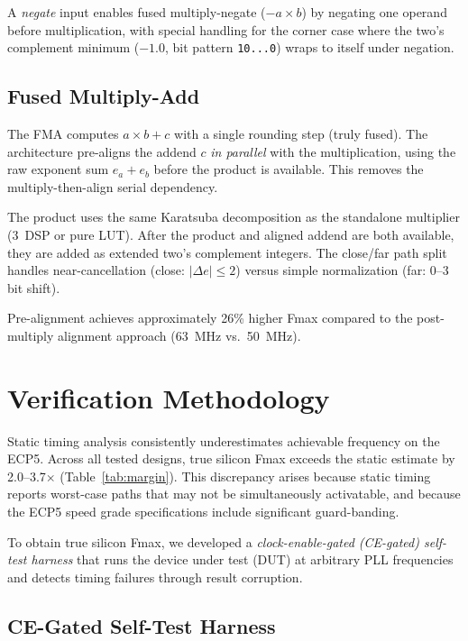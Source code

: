 \documentclass[10pt,twocolumn]{article}
\begin{document}
A \emph{negate} input enables fused multiply-negate ($-a \times b$)
by negating one operand before multiplication, with special handling
for the corner case where the two's complement minimum ($-1.0$,
bit pattern \texttt{10...0}) wraps to itself under negation.

\subsection{Fused Multiply-Add}
\label{sec:fma}

The FMA computes $a \times b + c$ with a single rounding step (truly
fused).  The architecture pre-aligns the addend $c$ \emph{in parallel}
with the multiplication, using the raw exponent sum $e_a + e_b$ before
the product is available.  This removes the multiply-then-align serial
dependency.

The product uses the same Karatsuba decomposition as the standalone
multiplier (3~DSP or pure LUT).  After the product and aligned addend
are both available, they are added as extended two's complement integers.
The close/far path split handles near-cancellation (close: $|\Delta e|
\leq 2$) versus simple normalization (far: 0--3 bit shift).

Pre-alignment achieves approximately 26\% higher Fmax compared to the
post-multiply alignment approach (63~MHz vs.\ 50~MHz).

\section{Verification Methodology}
\label{sec:method}

Static timing analysis consistently underestimates achievable frequency
on the ECP5.  Across all tested designs, true silicon Fmax exceeds the
static estimate by 2.0--3.7$\times$ (Table~\ref{tab:margin}).  This
discrepancy arises because static timing reports worst-case paths that
may not be simultaneously activatable, and because the ECP5 speed grade
specifications include significant guard-banding.

To obtain true silicon Fmax, we developed a \emph{clock-enable-gated
(CE-gated) self-test harness} that runs the device under test (DUT) at
arbitrary PLL frequencies and detects timing failures through result
corruption.

\subsection{CE-Gated Self-Test Harness}
\end{document}
